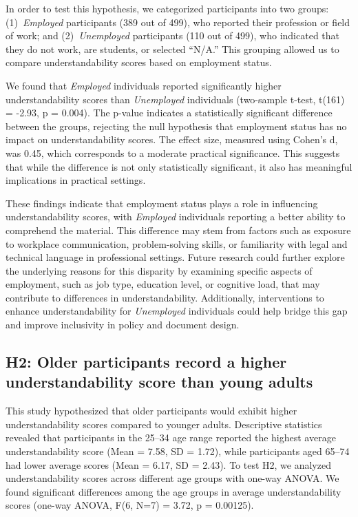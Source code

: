 In order to test this hypothesis, we categorized participants into two groups:
(1)~\textit{Employed} participants (389 out of 499), who reported their profession or field of work; and
(2)~\textit{Unemployed} participants (110 out of 499), who indicated that they do not work, are students, or selected ``N/A.''
This grouping allowed us to compare understandability scores based on employment status.

We found that \textit{Employed} individuals reported significantly higher understandability scores than \textit{Unemployed} individuals (two-sample t-test, t(161) = -2.93, p = 0.004).
The p-value indicates a statistically significant difference between the groups, rejecting the null hypothesis that employment status has no impact on understandability scores.
The effect size, measured using Cohen's d, was 0.45, which corresponds to a moderate practical significance.
This suggests that while the difference is not only statistically significant, it also has meaningful implications in practical settings.

These findings indicate that employment status plays a role in influencing understandability scores, with \textit{Employed} individuals reporting a better ability to comprehend the material.
This difference may stem from factors such as exposure to workplace communication, problem-solving skills, or familiarity with legal and technical language in professional settings.
Future research could further explore the underlying reasons for this disparity by examining specific aspects of employment, such as job type, education level, or cognitive load, that may contribute to differences in understandability.
Additionally, interventions to enhance understandability for \textit{Unemployed} individuals could help bridge this gap and improve inclusivity in policy and document design.


\subsection{H2: Older participants record a higher understandability score than young adults}

This study hypothesized that older participants would exhibit higher understandability scores compared to younger adults.
Descriptive statistics revealed that participants in the 25--34 age range reported the highest average understandability score (Mean = 7.58, SD = 1.72), while participants aged 65--74 had lower average scores (Mean = 6.17, SD = 2.43).
To test H2, we analyzed understandability scores across different age groups with one-way ANOVA.
We found significant differences among the age groups in average understandability scores (one-way ANOVA, F(6, N=7) = 3.72, p = 0.00125).

